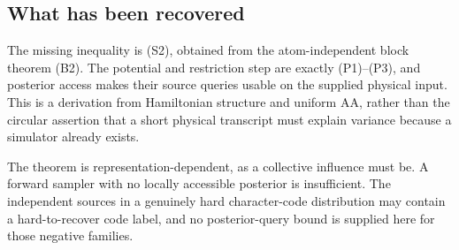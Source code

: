 \subsection{What has been recovered}\label{influence-recovery:what-has-been-recovered}

The missing inequality is (S2), obtained from the atom-independent block
theorem (B2). The potential and restriction step are exactly (P1)--(P3),
and posterior access makes their source queries usable on the supplied
physical input. This is a derivation from Hamiltonian structure and
uniform AA, rather than the circular assertion that a short physical
transcript must explain variance because a simulator already exists.

The theorem is representation-dependent, as a collective influence must
be. A forward sampler with no locally accessible posterior is
insufficient. The independent sources in a genuinely hard character-code
distribution may contain a hard-to-recover code label, and no
posterior-query bound is supplied here for those negative families.
